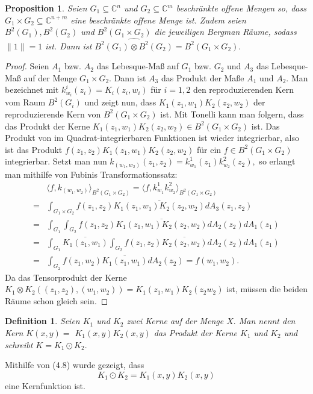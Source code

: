 \documentclass[12pt,titlepage,twoside,cleardoublepage]{article}
\theoremstyle{nummermitklammern}
\newtheorem{definition}[temp]{Definition}
\newtheorem{definition}[zahl]{Definition}
\numberwithin{equation}{section}
\newtheorem{proposition}[zahl]{Proposition}
\begin{document}
\begin{proposition}
Seien $G_1 \subseteq \mathbb{C}^n$ und $G_2 \subseteq \mathbb{C}^m$ beschränkte offene Mengen so, dass $G_1 \times G_2 \subseteq \mathbb{C}^{n+m}$ eine beschränkte offene Menge ist. Zudem seien $B^2(G_1),B^2(G_2)$ und $B^2(G_1\times G_2)$ die jeweiligen Bergman Räume, sodass $\|1\|=1$ ist. Dann ist $\widehat{B^2(G_1)\otimes B^2(G_2)}=B^2(G_1\times G_2).$ 
\end{proposition}
\begin{proof}
Seien $A_1$ bzw. $A_2$ das Lebesque-Maß auf $G_1$ bzw. $G_2$ und $A_3$ das Lebesque-Maß auf der Menge $G_1\times G_2.$ Dann ist $A_3$ das Produkt der Maße $A_1$ und $A_2.$
 Man bezeichnet mit $k^i_{w_i}(z_i)=K_i(z_i,w_i)$ für $i=1,2$ den reproduzierenden Kern vom Raum $B^2(G_i)$ und zeigt nun, dass $K_1(z_1,w_1)K_2(z_2,w_2)$ der reproduzierende Kern von $B^2(G_1\times G_2)$ ist. Mit Tonelli kann man folgern, dass das Produkt der Kerne $K_1(z_1,w_1)K_2(z_2,w_2)\in B^2(G_1\times G_2)$ ist. Das Produkt von im Quadrat-integrierbaren Funktionen ist wieder integrierbar, also ist das Produkt $f(z_1,z_2)K_1(z_1,w_1)K_2(z_2,w_2)$ für ein $f\in B^2(G_1\times G_2)$ integrierbar. 
Setzt man nun $k_{(w_1,w_2)}(z_1,z_2)=k^1_{w_1}(z_1)k^2_{w_2}(z_2),$ so erlangt man mithilfe von Fubinis Transformationssatz: 
\begin{align*}
&\langle f, k_{(w_1,w_2)}\rangle_{B^2(G_1\times G_2)}=\langle f,k^1_{w_1}k^2_{w_2}\rangle_{B^2(G_1\times G_2)}\\
=&\int_{G_1\times G_2}f(z_1,z_2)\overline{K_1(z_1,w_1)K_2(z_2,w_2)}dA_3(z_1,z_2)\\
=&\int_{G_1} \int_{G_2}f(z_1,z_2)\overline{K_1(z_1,w_1)K_2(z_2,w_2)}dA_2(z_2)dA_1(z_1)\\
=&\int_{G_1} \overline{K_1(z_1,w_1)}\int_{G_2}f(z_1,z_2)\overline{K_2(z_2,w_2)}dA_2(z_2)dA_1(z_1)\\
=&\int_{G_2}f(z_1,w_2)\overline{K_1(z_1,w_1)}dA_2(z_2)=f(w_1,w_2).
\end{align*}
Da das Tensorprodukt der Kerne $K_1\otimes K_2((z_1,z_2),(w_1,w_2))=K_1(z_1,w_1)K_2(z_2w_2)$ ist, müssen die beiden Räume schon gleich sein.
\end{proof}
\begin{definition}
Seien $K_1$ und $K_2$ zwei Kerne auf der Menge $X.$ Man nennt den Kern $K(x,y)=$ $K_1(x,y)K_2(x,y)$ das \emph{Produkt der Kerne} $K_1$ und $K_2$ und schreibt $K=K_1 \odot K_2.$ 
\end{definition}
Mithilfe von (4.8) wurde gezeigt, dass 
\[
K_1\odot K_2=K_1(x,y)K_2(x,y)
\] eine Kernfunktion ist. 
\end{document}
